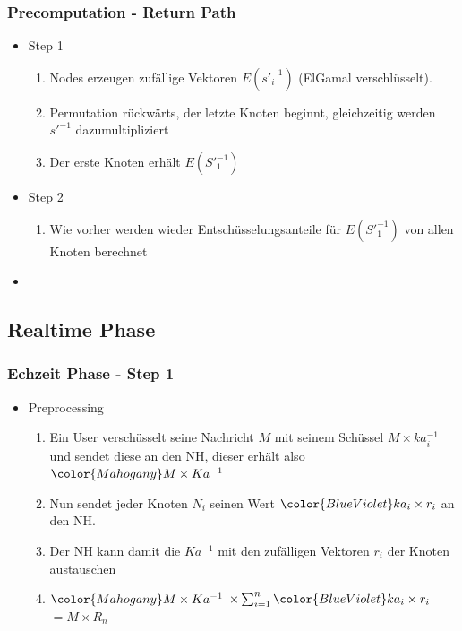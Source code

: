 \documentclass[t, xcolor=dvipsnames]{beamer}
\begin{document}
\begin{frame}
	\frametitle{Precomputation - Return Path}
	\begin{itemize}
		
		\item Step 1
		\begin{enumerate}
			\item Nodes erzeugen zufällige Vektoren $E({s'}_i^{-1})$ (ElGamal verschlüsselt).
			\item Permutation rückwärts, der letzte Knoten beginnt, gleichzeitig werden $s'^{-1}$ dazumultipliziert
			\item Der erste Knoten erhält $E({S'}_1^{-1})$
		\end{enumerate}
		\item Step 2
		\begin{enumerate}
			\item Wie vorher werden wieder Entschüsselungsanteile für $E({S'}_1^{-1})$ von allen Knoten berechnet
		\end{enumerate}
		\item 
		
		 
	\end{itemize}
	\vspace{\fill}
\end{frame}

\subsection{Realtime Phase} %
\begin{frame}
	\frametitle{Echzeit Phase - Step 1}
	\begin{itemize}
		\item Preprocessing
		\begin{enumerate}
		\item Ein User verschüsselt seine Nachricht $M$ mit seinem Schüssel $M \times ka_i^{-1}$ und sendet diese an den NH, dieser erhält also $\color{Mahogany}M \times Ka^{-1}$
		\item Nun sendet jeder Knoten $N_i$ seinen Wert $\color{BlueViolet}ka_i \times r_i$ an den NH.
		\item Der NH kann damit die $Ka^{-1}$ mit den zufälligen Vektoren $r_i$ der Knoten austauschen
		\item $ \color{Mahogany} M \times Ka^{-1}$ $\times \sum_{i=1}^n \color{BlueViolet}ka_i \times r_i$ $= M \times R_n$

		\end{enumerate}

		
	\end{itemize}
	\vspace{\fill}
\end{frame}
\end{document}
